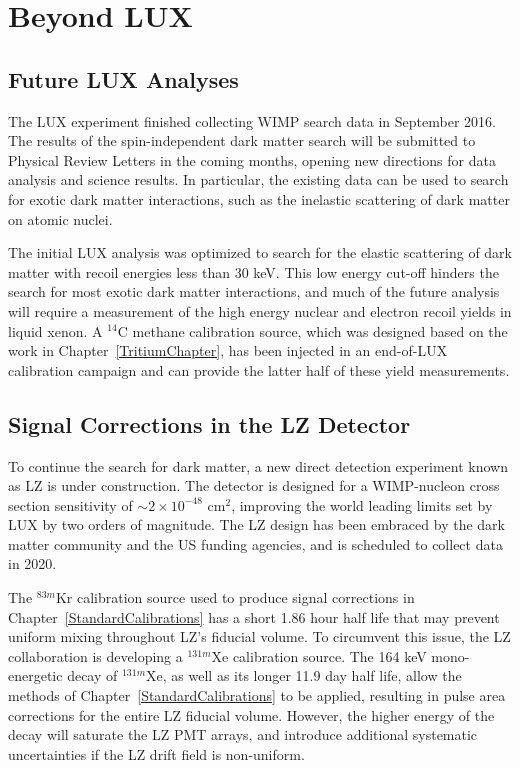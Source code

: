 \section{Beyond LUX} \label{LZChapter}

\subsection{Future LUX Analyses}

The LUX experiment finished collecting WIMP search data in September 2016.  The results of the spin-independent dark matter search will be submitted to Physical Review Letters in the coming months, opening new directions for data analysis and science results.  In particular, the existing data can be used to search for exotic dark matter interactions, such as the inelastic scattering of dark matter on atomic nuclei.  

The initial LUX analysis was optimized to search for the elastic scattering of dark matter with recoil energies less than 30 keV.  This low energy cut-off hinders the search for most exotic dark matter interactions, and much of the future analysis will require a measurement of the high energy nuclear and electron recoil yields in liquid xenon.  A $^{14}$C methane calibration source, which was designed based on the work in Chapter~\ref{TritiumChapter}, has been injected in an end-of-LUX calibration campaign and can provide the latter half of these yield measurements.


\subsection{Signal Corrections in the LZ Detector}

To continue the search for dark matter, a new direct detection experiment known as LZ is under construction.  The detector is designed for a WIMP-nucleon cross section sensitivity of $\sim 2 \times 10^{-48}$ cm$^2$, improving the world leading limits set by LUX by two orders of magnitude.  The LZ design has been embraced by the dark matter community and the US funding agencies, and is scheduled to collect data in 2020.

The $^{83m}$Kr calibration source used to produce signal corrections in Chapter~\ref{StandardCalibrations} has a short 1.86 hour half life that may prevent uniform mixing throughout LZ's fiducial volume.  To circumvent this issue, the LZ collaboration is developing a $^{131m}$Xe calibration source.  The 164 keV mono-energetic decay of $^{131m}$Xe, as well as its longer 11.9 day half life, allow the methods of Chapter~\ref{StandardCalibrations} to be applied, resulting in pulse area corrections for the entire LZ fiducial volume.  However, the higher energy of the decay will saturate the LZ PMT arrays, and introduce additional systematic uncertainties if the LZ drift field is non-uniform. 

